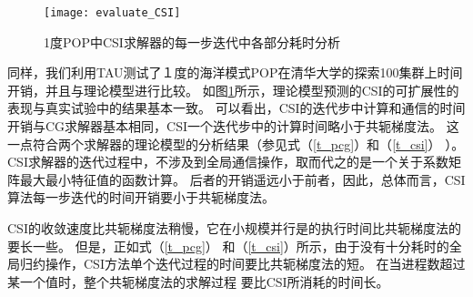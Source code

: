 \begin {figure}%
\centering
\texttt{[image: evaluate\_CSI]}
\caption[] { 1度POP中CSI求解器的每一步迭代中各部分耗时分析}
\label{fig:cst_ratio}
\end{figure}
同样，我们利用TAU测试了１度的海洋模式POP在清华大学的探索100集群上时间开销，并且与理论模型进行比较。
如图\ref{fig:cst_ratio}所示，理论模型预测的CSI的可扩展性的表现与真实试验中的结果基本一致。
可以看出，CSI的迭代步中计算和通信的时间开销与CG求解器基本相同，CSI一个迭代步中的计算时间略小于共轭梯度法。
这一点符合两个求解器的理论模型的分析结果（参见式（\ref{t_pcg}）和（\ref{t_csi}） ）。
CSI求解器的迭代过程中，不涉及到全局通信操作，取而代之的是一个关于系数矩阵最大最小特征值的函数计算。
后者的开销遥远小于前者，因此，总体而言，CSI算法每一步迭代的时间开销要小于共轭梯度法。 

CSI的收敛速度比共轭梯度法稍慢，它在小规模并行是的执行时间比共轭梯度法的要长一些。 
但是，正如式（\ref{t_pcg}） 和（\ref{t_csi}）所示，由于没有十分耗时的全局归约操作，CSI方法单个迭代过程的时间要比共轭梯度法的短。 
在当进程数超过某一个值时，整个共轭梯度法的求解过程 要比CSI所消耗的时间长。 


